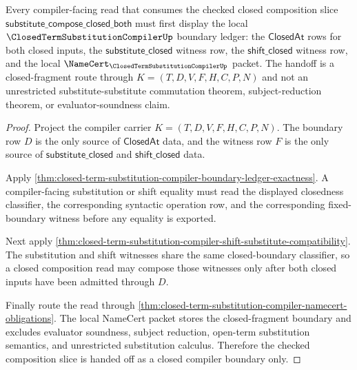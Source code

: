 \begin{theorem}
\label{thm:closed-term-substitution-compiler-closed-composition-handoff}
Every compiler-facing read that consumes the checked closed composition slice $\mathsf{substitute\_compose\_closed\_both}$ must first display the local $\ClosedTermSubstitutionCompilerUp$ boundary ledger: the $\mathsf{ClosedAt}$ rows for both closed inputs, the $\mathsf{substitute\_closed}$ witness row, the $\mathsf{shift\_closed}$ witness row, and the local $\NameCert_{\ClosedTermSubstitutionCompilerUp}$ packet. The handoff is a closed-fragment route through $K=(T,D,V,F,H,C,P,N)$ and not an unrestricted substitute-substitute commutation theorem, subject-reduction theorem, or evaluator-soundness claim.
\end{theorem}
\begin{proof}
Project the compiler carrier $K=(T,D,V,F,H,C,P,N)$. The boundary row $D$ is the only source of $\mathsf{ClosedAt}$ data, and the witness row $F$ is the only source of $\mathsf{substitute\_closed}$ and $\mathsf{shift\_closed}$ data.

Apply \autoref{thm:closed-term-substitution-compiler-boundary-ledger-exactness}. A compiler-facing substitution or shift equality must read the displayed closedness classifier, the corresponding syntactic operation row, and the corresponding fixed-boundary witness before any equality is exported.

Next apply \autoref{thm:closed-term-substitution-compiler-shift-substitute-compatibility}. The substitution and shift witnesses share the same closed-boundary classifier, so a closed composition read may compose those witnesses only after both closed inputs have been admitted through $D$.

Finally route the read through \autoref{thm:closed-term-substitution-compiler-namecert-obligations}. The local NameCert packet stores the closed-fragment boundary and excludes evaluator soundness, subject reduction, open-term substitution semantics, and unrestricted substitution calculus. Therefore the checked composition slice is handed off as a closed compiler boundary only.
\end{proof}

